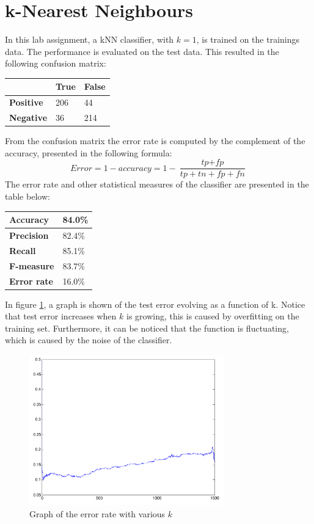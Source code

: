 \documentclass[a4paper]{article}
\begin{document}
\section{k-Nearest Neighbours}
In this lab assignment, a kNN classifier, with $k = 1$, is trained on the trainings data. The performance is evaluated on the test data. This resulted in the following confusion matrix:
\begin{center}
\begin{tabular}{ | l | l | l | }
\hline
 & \textbf{True} & \textbf{False}\\
\hline
\textbf{Positive} & 206 & 44\\
\hline
\textbf{Negative} & 36 & 214\\
\hline
\end{tabular}
\end{center}
From the confusion matrix the error rate is computed by the complement of the accuracy, presented in the following formula:
\begin{equation}
\textit{Error} = 1 - \textit{accuracy} = 1 - \frac{\textit{tp} + \textit{fp}}{\textit{tp} + \textit{tn} + \textit{fp} + \textit{fn}}
\end{equation}
The error rate and other statistical measures of the classifier are presented in the table below:
\begin{center}
\begin{tabular}{ | l | l | }
\hline
\textbf{Accuracy} & 84.0\%\\
\hline
\textbf{Precision} & 82.4\%\\
\hline
\textbf{Recall} & 85.1\%\\
\hline
\textbf{F-measure} & 83.7\%\\
\hline
\textbf{Error rate} & 16.0\%\\
\hline
\end{tabular}
\end{center}
In figure \ref{error_rate}, a graph is shown of the test error evolving as a function of k. Notice that test error increases when $k$ is growing, this is caused by overfitting on the training set. Furthermore, it can be noticed that the function is fluctuating, which is caused by the noise of the classifier.
\begin{figure}[!ht]
\centering
\includegraphics[width=0.75\textwidth]{images/error_rate_1500_1.pdf}
\caption{Graph of the error rate with various $k$}
\label{error_rate}
\end{figure}\\
\end{document}
